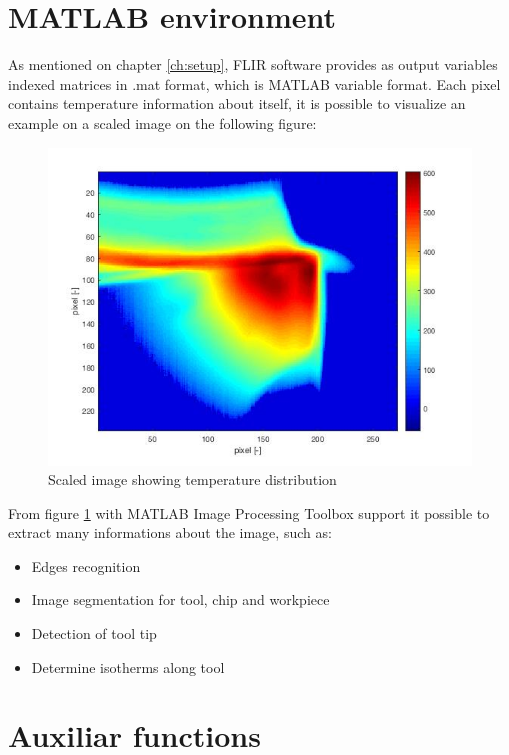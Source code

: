 \section{MATLAB environment}
	As mentioned on chapter \ref{ch:setup}, FLIR software provides as output variables indexed matrices in .mat format, which is MATLAB variable format. Each pixel contains temperature information about itself, it is possible to visualize an example on a scaled image on the following figure:

	\begin{figure}[H]
		\centering
		\captionsetup{justification=centering}
		\includegraphics[scale=0.6]{Cap4/TempDist.jpg}
		\caption{Scaled image showing temperature distribution}
		\label{fig:tempdist}
	\end{figure}

	From figure \ref{fig:tempdist} with MATLAB Image Processing Toolbox support it possible to extract many informations about the image, such as:

	\begin{itemize}
		\item Edges recognition
		\item Image segmentation for tool, chip and workpiece
		\item Detection of tool tip
		\item Determine isotherms along tool
	\end{itemize}
	
\section{Auxiliar functions}
